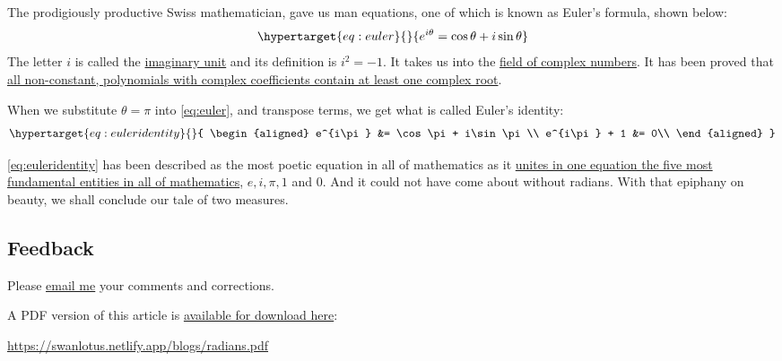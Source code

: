 \documentclass[
  a4paper,
]{article}
\begin{document}
The prodigiously productive Swiss mathematician, gave us man equations,
one of which is known as Euler's formula, shown below:
\begin{equation}\protect\hypertarget{eq:euler}{}{
e^{i\theta} = \cos\theta + i\sin\theta
}\label{eq:euler}\end{equation} The letter \(i\) is called the
\href{https://en.wikipedia.org/wiki/Imaginary_unit}{imaginary unit} and
its definition is \(i^{2} = -1\). It takes us into the
\href{https://en.wikipedia.org/wiki/Complex_number}{field of complex
numbers}. It has been proved that
\href{https://en.wikipedia.org/wiki/Fundamental_theorem_of_algebra}{all
non-constant, polynomials with complex coefficients contain at least one
complex root}.

When we substitute \(\theta=\pi\) into \cref{eq:euler}, and transpose
terms, we get what is called Euler's identity:
\begin{equation}\protect\hypertarget{eq:euleridentity}{}{
\begin{aligned}
e^{i\pi} &= \cos\pi + i\sin\pi\\
e^{i\pi} + 1 &= 0\\
\end{aligned}
}\label{eq:euleridentity}\end{equation}

\cref{eq:euleridentity} has been described as the most poetic equation
in all of mathematics as it
\href{https://www.livescience.com/51399-eulers-identity.html}{unites in
one equation the five most fundamental entities in all of mathematics},
\(e, i, \pi, 1\) and \(0\). And it could not have come about without
radians. With that epiphany on beauty, we shall conclude our tale of two
measures.

\hypertarget{feedback}{%
\subsection{Feedback}\label{feedback}}

Please \href{mailto:feedback.swanlotus@gmail.com}{email me} your
comments and corrections.

\noindent A PDF version of this article is
\href{./radians.pdf}{available for download here}:

\begin{small}

\begin{sffamily}

\url{https://swanlotus.netlify.app/blogs/radians.pdf}

\end{sffamily}

\end{small}
\end{document}

